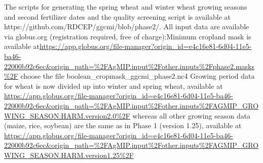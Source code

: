 \documentclass[gmd, manuscript]{copernicus} %
\providecommand{\DIFaddend}{} %
\begin{document}
{\begin{sloppypar}
The scripts for generating the spring wheat and winter wheat 
growing seasons and second fertilizer dates and the quality screening 
script is available at https://github.com/RDCEP/ggcmi/blob/phase2/.
All input data are available via globus.org (registration required, free 
of charge):Minimum cropland mask is available at\url{https://app.globus.org/file-manager?origin_id=e4c16e81-6d04-11e5-ba46-22000b92c6ec&origin_path=\%2FAgMIP.input\%2Fother.inputs\%2Fphase2.masks\%2F}
choose the file boolean\_cropmask\_ggcmi\_phase2.nc4
Growing period data for wheat is now divided up into winter and spring 
wheat, available at \url{https://app.globus.org/file-manager?origin_id=e4c16e81-6d04-11e5-ba46-22000b92c6ec&origin_path=\%2FAgMIP.input\%2Fother.inputs\%2FAGMIP_GROWING_SEASON.HARM.version2.0\%2F}
whereas all other growing season data (maize, rice, soybean) are the 
same as in Phase 1 (version 1.25), available at \url{https://app.globus.org/file-manager?origin_id=e4c16e81-6d04-11e5-ba46-22000b92c6ec&origin_path=\%2FAgMIP.input\%2Fother.inputs\%2FAGMIP_GROWING_SEASON.HARM.version1.25\%2F}
\end{sloppypar}
}
\DIFaddend 



\end{document}
